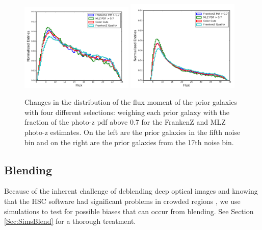 \documentclass[useAMS,usenatbib]{mnras}
\begin{document}
\begin{figure}
    \includegraphics[width=0.48\textwidth]{diff_flux_prior_bin4.png}
    \includegraphics[width=0.48\textwidth]{diff_flux_prior_bin17.png}
    \caption{
       Changes in the distribution of the flux moment of the prior galaxies with four different selections: weighing each prior galaxy with the fraction of the photo-z pdf above 0.7 for the FrankenZ and MLZ photo-z estimates.  On the left are the prior galaxies in the fifth noise bin and on the right are the prior galaxies from the 17th noise bin.
    }
    \label{fig:diff_flux_prior}
\end{figure}



\subsection{Blending}
Because of the inherent challenge of deblending deep optical images and knowing that the HSC software had significant problems in crowded regions \citep{CatalogPaper:inprep}, we use simulations to test for possible biases that can occur from blending.  See Section \ref{Sec:SimsBlend} for a thorough treatment.
\end{document}

